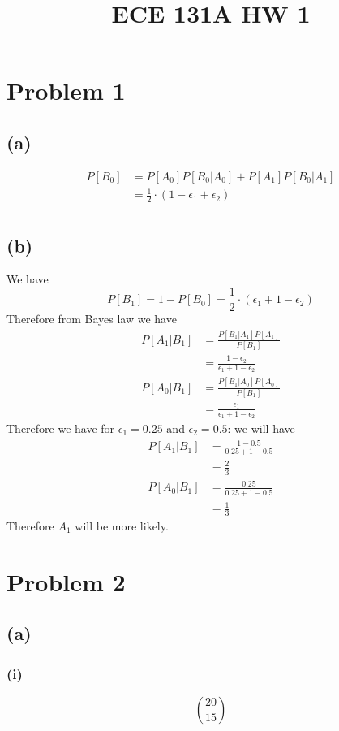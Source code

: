 
\title{ECE 131A HW 1}

\maketitle
\section*{Problem 1}
\subsection*{(a)}
\begin{align*}
    P[B_0]&=P[A_0]P[B_0|A_0]+P[A_1]P[B_0|A_1]\\
    &=\boxed{\frac{1}{2}\cdot(1-\epsilon_1+\epsilon_2)}\\
\end{align*}
\subsection*{(b)}
We have 
$$P[B_1]=1-P[B_0]=\frac{1}{2}\cdot(\epsilon_1+1-\epsilon_2)$$
Therefore from Bayes law we have
\begin{align*}
    P[A_1|B_1]&=\frac{P[B_1|A_1]P[A_1]}{P[B_1]}\\
    &=\frac{1-\epsilon_2}{\epsilon_1+1-\epsilon_2}
\end{align*}
\begin{align*}
    P[A_0|B_1]&=\frac{P[B_1|A_0]P[A_0]}{P[B_1]}\\
    &=\frac{\epsilon_1}{\epsilon_1+1-\epsilon_2}
\end{align*}
Therefore we have for $\epsilon_1=0.25$ and $\epsilon_2=0.5$:
we will have
\begin{align*}
    P[A_1|B_1]&=\frac{1-0.5}{0.25+1-0.5}\\
    &=\frac{2}{3}\\
    P[A_0|B_1]&=\frac{0.25}{0.25+1-0.5}\\
    &=\frac{1}{3}
\end{align*}
Therefore $A_1$ will be more likely. 
\section*{Problem 2}
\subsection*{(a)}
\subsubsection*{(i)}
$$\boxed{20 \choose 15}$$
